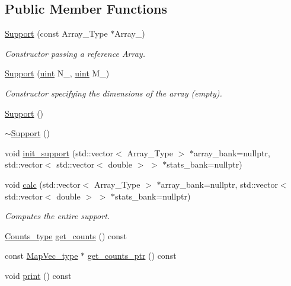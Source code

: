\subsection*{Public Member Functions}
\begin{DoxyCompactItemize}
\item 
\hyperlink{class_support_aacc2852ede9e8d1294b8f2ea5625d525}{Support} (const Array\+\_\+\+Type $\ast$Array\+\_\+)
\begin{DoxyCompactList}\small\item\em Constructor passing a reference Array. \end{DoxyCompactList}\item 
\hyperlink{class_support_a1f6a7ae36567effe999602df879321cd}{Support} (\hyperlink{typedefs_8hpp_a91ad9478d81a7aaf2593e8d9c3d06a14}{uint} N\+\_\+, \hyperlink{typedefs_8hpp_a91ad9478d81a7aaf2593e8d9c3d06a14}{uint} M\+\_\+)
\begin{DoxyCompactList}\small\item\em Constructor specifying the dimensions of the array (empty). \end{DoxyCompactList}\item 
\hyperlink{class_support_a489bf1d96a2ae1e8494eb94d8d366e3f}{Support} ()
\item 
\hyperlink{class_support_a9c5f33ac43d962272b616948dec5d825}{$\sim$\+Support} ()
\item 
void \hyperlink{class_support_a013872a55ffd6a0a931e124da8e8dc99}{init\+\_\+support} (std\+::vector$<$ Array\+\_\+\+Type $>$ $\ast$array\+\_\+bank=nullptr, std\+::vector$<$ std\+::vector$<$ double $>$ $>$ $\ast$stats\+\_\+bank=nullptr)
\item 
void \hyperlink{class_support_afa36b8c1348e28c51296379157f58081}{calc} (std\+::vector$<$ Array\+\_\+\+Type $>$ $\ast$array\+\_\+bank=nullptr, std\+::vector$<$ std\+::vector$<$ double $>$ $>$ $\ast$stats\+\_\+bank=nullptr)
\begin{DoxyCompactList}\small\item\em Computes the entire support. \end{DoxyCompactList}\item 
\hyperlink{typedefs_8hpp_aee40fa17c1fddb63dd1f2b1470ade95b}{Counts\+\_\+type} \hyperlink{class_support_a5d93a94eaed9b1157fb934284883fd47}{get\+\_\+counts} () const
\item 
const \hyperlink{typedefs_8hpp_a02ed8dec96bc528c8bc3d8cb3c4674a5}{Map\+Vec\+\_\+type} $\ast$ \hyperlink{class_support_abcb4dea3c5a1b140990821900432f90e}{get\+\_\+counts\+\_\+ptr} () const
\item 
void \hyperlink{class_support_af87b2e85ec72e394387946023508e7fd}{print} () const
\end{DoxyCompactItemize}

